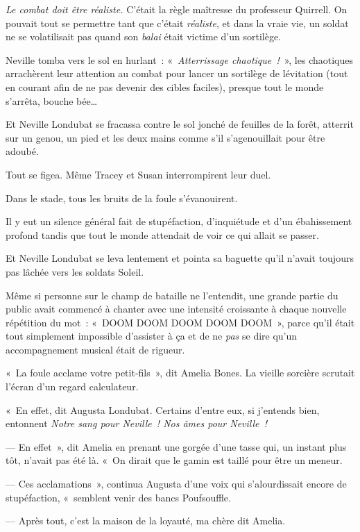 \emph{Le combat doit être réaliste.} C'était la règle maîtresse du professeur Quirrell. On pouvait tout se permettre tant que c'était \emph{réaliste}, et dans la vraie vie, un soldat ne se volatilisait pas quand son \emph{balai} était victime d'un sortilège.

Neville tomba vers le sol en hurlant~: «~\emph{Atterrissage chaotique~!}~», les chaotiques arrachèrent leur attention au combat pour lancer un sortilège de lévitation (tout en courant afin de ne pas devenir des cibles faciles), presque tout le monde s'arrêta, bouche bée…

Et Neville Londubat se fracassa contre le sol jonché de feuilles de la forêt, atterrit sur un genou, un pied et les deux mains comme s'il s'agenouillait pour être adoubé.

Tout se figea. Même Tracey et Susan interrompirent leur duel.

Dans le stade, tous les bruits de la foule s'évanouirent.

Il y eut un silence général fait de stupéfaction, d'inquiétude et d'un ébahissement profond tandis que tout le monde attendait de voir ce qui allait se passer.

Et Neville Londubat se leva lentement et pointa sa baguette qu'il n'avait toujours pas lâchée vers les soldats Soleil.

Même si personne sur le champ de bataille ne l'entendit, une grande partie du public avait commencé à chanter avec une intensité croissante à chaque nouvelle répétition du mot~: «~DOOM DOOM DOOM DOOM DOOM~», parce qu'il était tout simplement impossible d'assister à ça et de ne \emph{pas} se dire qu'un accompagnement musical était de rigueur.

«~La foule acclame votre petit-fils~», dit Amelia Bones. La vieille sorcière scrutait l'écran d'un regard calculateur.

«~En effet, dit Augusta Londubat. Certains d'entre eux, si j'entends bien, entonnent \emph{Notre sang pour Neville~! Nos âmes pour Neville~!}

--- En effet~», dit Amelia en prenant une gorgée d'une tasse qui, un instant plus tôt, n'avait pas été là. «~On dirait que le gamin est taillé pour être un meneur.

--- Ces acclamations~», continua Augusta d'une voix qui s'alourdissait encore de stupéfaction, «~semblent venir des bancs Poufsouffle.

--- Après tout, c'est la maison de la loyauté, ma chère dit Amelia.

